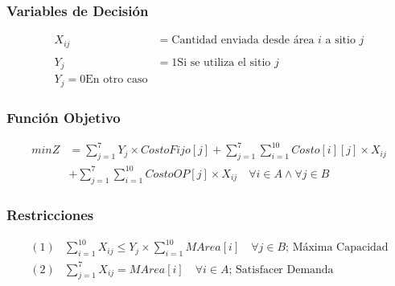 \documentclass[a4paper,12pt]{article}
\begin{document}
\subsubsection{Variables de Decisión}
\begin{equation*}
\begin{split}
	X_{ij}&=\text{Cantidad enviada desde área } i \text{ a sitio } j\\
	\\
	Y_j&=1 \text{Si se utiliza el sitio } j\\
	Y_j=0 \text{En otro caso}
\end{split}
\end{equation*}
\subsubsection{Función Objetivo}
\begin{equation*}
\begin{split}
	minZ &= \sum_{j=1}^{7}Y_j\times CostoFijo[j] + \sum_{j=1}^{7}\sum_{i=1}^{10}Costo[i][j]\times X_{ij}\\ 
	&+ \sum_{j=1}^{7}\sum_{i=1}^{10}CostoOP[j]\times X_{ij} \quad \forall i \in A \wedge \forall j \in B
\end{split}
\end{equation*}
\subsubsection{Restricciones}
\begin{equation*}
\begin{split}
	(1)& \sum_{i=1}^{10}X_{ij}\leq Y_{j}\times \sum_{i=1}^{10}MArea[i]\quad\forall j\in B \text{; Máxima Capacidad}\\
	(2)&\sum_{j=1}^{7}X_{ij}=MArea[i]\quad\forall i\in A \text{; Satisfacer Demanda}
\end{split}
\end{equation*}
\end{document}
